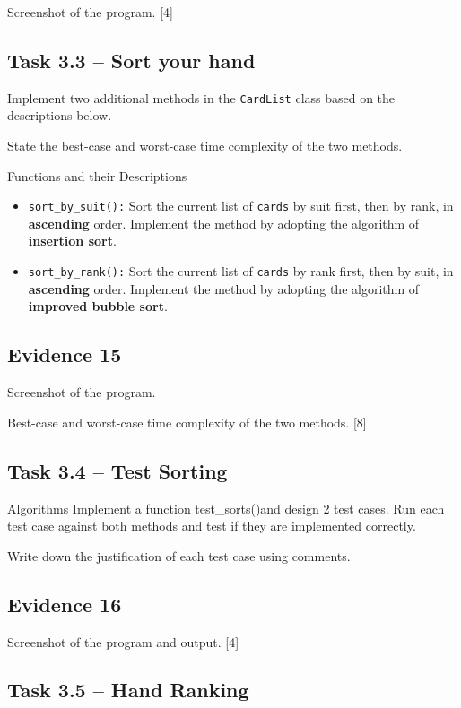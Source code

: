 Screenshot of the program. \hfill{}{[}4{]}

\subsection*{Task 3.3 -- Sort your hand }

Implement two additional methods in the \texttt{CardList} class based
on the descriptions below. 

State the best-case and worst-case time complexity of the two methods. 

Functions and their Descriptions
\begin{itemize}
\item \texttt{sort\_by\_suit():} Sort the current list of \texttt{cards}
by suit first, then by rank, in \textbf{ascending} order. Implement
the method by adopting the algorithm of \textbf{insertion sort}.
\item \texttt{sort\_by\_rank():} Sort the current list of \texttt{cards}
by rank first, then by suit, in \textbf{ascending} order. Implement
the method by adopting the algorithm of \textbf{improved bubble sort}.
\end{itemize}

\subsection*{Evidence 15}

Screenshot of the program. 

Best-case and worst-case time complexity of the two methods.\hfill{}
{[}8{]}

\subsection*{Task 3.4 -- Test Sorting}

Algorithms Implement a function test\_sorts()and design 2 test cases.
Run each test case against both methods and test if they are implemented
correctly. 

Write down the justification of each test case using comments. 

\subsection*{Evidence 16}

Screenshot of the program and output. \hfill{}{[}4{]}

\subsection*{Task 3.5 -- Hand Ranking }

